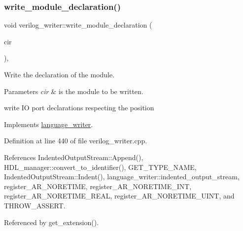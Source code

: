 \subsubsection{\texorpdfstring{write\+\_\+module\+\_\+declaration()}{write\_module\_declaration()}}
{\footnotesize\ttfamily void verilog\+\_\+writer\+::write\+\_\+module\+\_\+declaration (\begin{DoxyParamCaption}\item[{const \hyperlink{structural__objects_8hpp_a8ea5f8cc50ab8f4c31e2751074ff60b2}{structural\+\_\+object\+Ref} \&}]{cir }\end{DoxyParamCaption})\hspace{0.3cm}{\ttfamily [override]}, {\ttfamily [virtual]}}



Write the declaration of the module. 


\begin{DoxyParams}{Parameters}
{\em cir} & is the module to be written. \\
\hline
\end{DoxyParams}
write IO port declarations respecting the position 

Implements \hyperlink{classlanguage__writer_a32b5b9395eb518430fca70b1d49ff133}{language\+\_\+writer}.



Definition at line 440 of file verilog\+\_\+writer.\+cpp.



References Indented\+Output\+Stream\+::\+Append(), H\+D\+L\+\_\+manager\+::convert\+\_\+to\+\_\+identifier(), G\+E\+T\+\_\+\+T\+Y\+P\+E\+\_\+\+N\+A\+ME, Indented\+Output\+Stream\+::\+Indent(), language\+\_\+writer\+::indented\+\_\+output\+\_\+stream, register\+\_\+\+A\+R\+\_\+\+N\+O\+R\+E\+T\+I\+ME, register\+\_\+\+A\+R\+\_\+\+N\+O\+R\+E\+T\+I\+M\+E\+\_\+\+I\+NT, register\+\_\+\+A\+R\+\_\+\+N\+O\+R\+E\+T\+I\+M\+E\+\_\+\+R\+E\+AL, register\+\_\+\+A\+R\+\_\+\+N\+O\+R\+E\+T\+I\+M\+E\+\_\+\+U\+I\+NT, and T\+H\+R\+O\+W\+\_\+\+A\+S\+S\+E\+RT.



Referenced by get\+\_\+extension().

